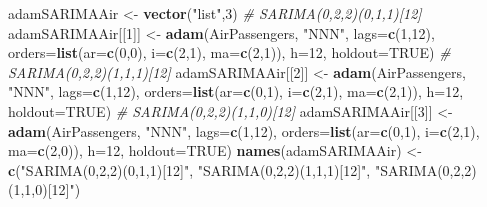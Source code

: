 \documentclass[]{book}
\newenvironment{Shaded}{\begin{snugshade}}{\end{snugshade}}
\newcommand{\CommentTok}[1]{\textcolor[rgb]{0.56,0.35,0.01}{\textit{#1}}}
\newcommand{\DataTypeTok}[1]{\textcolor[rgb]{0.13,0.29,0.53}{#1}}
\newcommand{\DecValTok}[1]{\textcolor[rgb]{0.00,0.00,0.81}{#1}}
\newcommand{\KeywordTok}[1]{\textcolor[rgb]{0.13,0.29,0.53}{\textbf{#1}}}
\newcommand{\NormalTok}[1]{#1}
\newcommand{\OtherTok}[1]{\textcolor[rgb]{0.56,0.35,0.01}{#1}}
\newcommand{\StringTok}[1]{\textcolor[rgb]{0.31,0.60,0.02}{#1}}
\theoremstyle{definition}
\theoremstyle{definition}
\theoremstyle{definition}
\theoremstyle{definition}
\theoremstyle{remark}
\begin{document}
\begin{Shaded}
\begin{Highlighting}[]
\NormalTok{adamSARIMAAir <-}\StringTok{ }\KeywordTok{vector}\NormalTok{(}\StringTok{"list"}\NormalTok{,}\DecValTok{3}\NormalTok{)}
\CommentTok{# SARIMA(0,2,2)(0,1,1)[12]}
\NormalTok{adamSARIMAAir[[}\DecValTok{1}\NormalTok{]] <-}\StringTok{ }\KeywordTok{adam}\NormalTok{(AirPassengers, }\StringTok{"NNN"}\NormalTok{, }\DataTypeTok{lags=}\KeywordTok{c}\NormalTok{(}\DecValTok{1}\NormalTok{,}\DecValTok{12}\NormalTok{),}
                           \DataTypeTok{orders=}\KeywordTok{list}\NormalTok{(}\DataTypeTok{ar=}\KeywordTok{c}\NormalTok{(}\DecValTok{0}\NormalTok{,}\DecValTok{0}\NormalTok{), }\DataTypeTok{i=}\KeywordTok{c}\NormalTok{(}\DecValTok{2}\NormalTok{,}\DecValTok{1}\NormalTok{),}
                                       \DataTypeTok{ma=}\KeywordTok{c}\NormalTok{(}\DecValTok{2}\NormalTok{,}\DecValTok{1}\NormalTok{)),}
                           \DataTypeTok{h=}\DecValTok{12}\NormalTok{, }\DataTypeTok{holdout=}\OtherTok{TRUE}\NormalTok{)}
\CommentTok{# SARIMA(0,2,2)(1,1,1)[12]}
\NormalTok{adamSARIMAAir[[}\DecValTok{2}\NormalTok{]] <-}\StringTok{ }\KeywordTok{adam}\NormalTok{(AirPassengers, }\StringTok{"NNN"}\NormalTok{, }\DataTypeTok{lags=}\KeywordTok{c}\NormalTok{(}\DecValTok{1}\NormalTok{,}\DecValTok{12}\NormalTok{),}
                           \DataTypeTok{orders=}\KeywordTok{list}\NormalTok{(}\DataTypeTok{ar=}\KeywordTok{c}\NormalTok{(}\DecValTok{0}\NormalTok{,}\DecValTok{1}\NormalTok{), }\DataTypeTok{i=}\KeywordTok{c}\NormalTok{(}\DecValTok{2}\NormalTok{,}\DecValTok{1}\NormalTok{),}
                                       \DataTypeTok{ma=}\KeywordTok{c}\NormalTok{(}\DecValTok{2}\NormalTok{,}\DecValTok{1}\NormalTok{)),}
                           \DataTypeTok{h=}\DecValTok{12}\NormalTok{, }\DataTypeTok{holdout=}\OtherTok{TRUE}\NormalTok{)}
\CommentTok{# SARIMA(0,2,2)(1,1,0)[12]}
\NormalTok{adamSARIMAAir[[}\DecValTok{3}\NormalTok{]] <-}\StringTok{ }\KeywordTok{adam}\NormalTok{(AirPassengers, }\StringTok{"NNN"}\NormalTok{, }\DataTypeTok{lags=}\KeywordTok{c}\NormalTok{(}\DecValTok{1}\NormalTok{,}\DecValTok{12}\NormalTok{),}
                           \DataTypeTok{orders=}\KeywordTok{list}\NormalTok{(}\DataTypeTok{ar=}\KeywordTok{c}\NormalTok{(}\DecValTok{0}\NormalTok{,}\DecValTok{1}\NormalTok{), }\DataTypeTok{i=}\KeywordTok{c}\NormalTok{(}\DecValTok{2}\NormalTok{,}\DecValTok{1}\NormalTok{),}
                                       \DataTypeTok{ma=}\KeywordTok{c}\NormalTok{(}\DecValTok{2}\NormalTok{,}\DecValTok{0}\NormalTok{)),}
                           \DataTypeTok{h=}\DecValTok{12}\NormalTok{, }\DataTypeTok{holdout=}\OtherTok{TRUE}\NormalTok{)}
\KeywordTok{names}\NormalTok{(adamSARIMAAir) <-}\StringTok{ }\KeywordTok{c}\NormalTok{(}\StringTok{"SARIMA(0,2,2)(0,1,1)[12]"}\NormalTok{,}
                          \StringTok{"SARIMA(0,2,2)(1,1,1)[12]"}\NormalTok{,}
                          \StringTok{"SARIMA(0,2,2)(1,1,0)[12]"}\NormalTok{)}
\end{Highlighting}
\end{Shaded}
\end{document}

